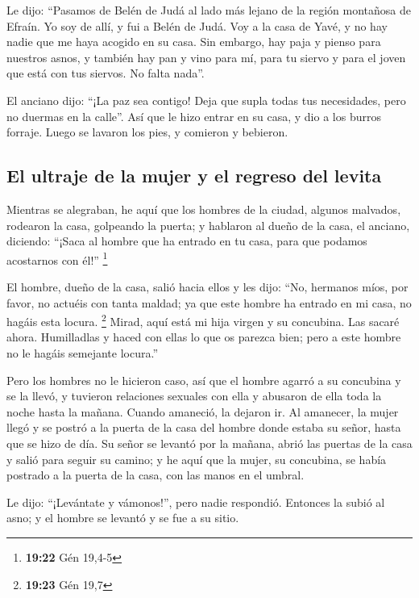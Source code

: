 \begin{paracol}{2}
 Le dijo: ``Pasamos de Belén de Judá al lado más lejano
de la región montañosa de Efraín. Yo soy de allí, y fui a Belén de Judá.
Voy a la casa de Yavé, y no hay nadie que me haya acogido en su casa.
 Sin embargo, hay paja y pienso para nuestros asnos, y
también hay pan y vino para mí, para tu siervo y para el joven que está
con tus siervos. No falta nada''.

 El anciano dijo: ``¡La paz sea contigo! Deja que supla
todas tus necesidades, pero no duermas en la calle''. 
Así que le hizo entrar en su casa, y dio a los burros forraje. Luego se
lavaron los pies, y comieron y bebieron.

\hypertarget{el-ultraje-de-la-mujer-y-el-regreso-del-levita}{%
\subsection{El ultraje de la mujer y el regreso del
levita}\label{el-ultraje-de-la-mujer-y-el-regreso-del-levita}}

 Mientras se alegraban, he aquí que los hombres de la
ciudad, algunos malvados, rodearon la casa, golpeando la puerta; y
hablaron al dueño de la casa, el anciano, diciendo: ``¡Saca al hombre
que ha entrado en tu casa, para que podamos acostarnos con él!''
\footnote{\textbf{19:22} Gén 19,4-5}

 El hombre, dueño de la casa, salió hacia ellos y les
dijo: ``No, hermanos míos, por favor, no actuéis con tanta maldad; ya
que este hombre ha entrado en mi casa, no hagáis esta locura.
\footnote{\textbf{19:23} Gén 19,7}  Mirad, aquí está mi
hija virgen y su concubina. Las sacaré ahora. Humilladlas y haced con
ellas lo que os parezca bien; pero a este hombre no le hagáis semejante
locura.''

 Pero los hombres no le hicieron caso, así que el hombre
agarró a su concubina y se la llevó, y tuvieron relaciones sexuales con
ella y abusaron de ella toda la noche hasta la mañana. Cuando amaneció,
la dejaron ir.  Al amanecer, la mujer llegó y se postró a
la puerta de la casa del hombre donde estaba su señor, hasta que se hizo
de día.  Su señor se levantó por la mañana, abrió las
puertas de la casa y salió para seguir su camino; y he aquí que la
mujer, su concubina, se había postrado a la puerta de la casa, con las
manos en el umbral.

 Le dijo: ``¡Levántate y vámonos!'', pero nadie
respondió. Entonces la subió al asno; y el hombre se levantó y se fue a
su sitio.


\end{paracol}
